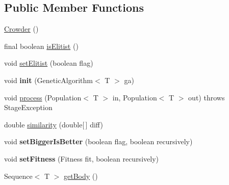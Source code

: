 \subsection*{Public Member Functions}
\begin{DoxyCompactItemize}
\item 
\hyperlink{classjenes_1_1stage_1_1operator_1_1_crowder_3_01_t_01extends_01_chromosome_01_4_a6e23e3544b98e1a415c53fcedd541df5}{Crowder} ()
\item 
final boolean \hyperlink{classjenes_1_1stage_1_1operator_1_1_crowder_3_01_t_01extends_01_chromosome_01_4_ab9bb2a8d6bf09a51158ef49917095913}{is\-Elitist} ()
\item 
void \hyperlink{classjenes_1_1stage_1_1operator_1_1_crowder_3_01_t_01extends_01_chromosome_01_4_ad995907f114cdd40eb03d53f05734b8c}{set\-Elitist} (boolean flag)
\item 
\hypertarget{classjenes_1_1stage_1_1operator_1_1_crowder_3_01_t_01extends_01_chromosome_01_4_a345ecb8e82d64130d171fb785f2702e6}{void {\bfseries init} (Genetic\-Algorithm$<$ T $>$ ga)}\label{classjenes_1_1stage_1_1operator_1_1_crowder_3_01_t_01extends_01_chromosome_01_4_a345ecb8e82d64130d171fb785f2702e6}

\item 
void \hyperlink{classjenes_1_1stage_1_1operator_1_1_crowder_3_01_t_01extends_01_chromosome_01_4_a21f0859b05e06d7ee4b979d5a2d559d7}{process} (Population$<$ T $>$ in, Population$<$ T $>$ out)  throws Stage\-Exception 
\item 
double \hyperlink{classjenes_1_1stage_1_1operator_1_1_crowder_3_01_t_01extends_01_chromosome_01_4_a99b3aaad504589efa9c408fc1b4e2fa1}{similarity} (double\mbox{[}$\,$\mbox{]} diff)
\item 
\hypertarget{classjenes_1_1stage_1_1operator_1_1_crowder_3_01_t_01extends_01_chromosome_01_4_a65ef754570b25a6f14fbd78e6c08c4f9}{void {\bfseries set\-Bigger\-Is\-Better} (boolean flag, boolean recursively)}\label{classjenes_1_1stage_1_1operator_1_1_crowder_3_01_t_01extends_01_chromosome_01_4_a65ef754570b25a6f14fbd78e6c08c4f9}

\item 
\hypertarget{classjenes_1_1stage_1_1operator_1_1_crowder_3_01_t_01extends_01_chromosome_01_4_ac6c89c383d27754be63fabc951e11dc8}{void {\bfseries set\-Fitness} (Fitness fit, boolean recursively)}\label{classjenes_1_1stage_1_1operator_1_1_crowder_3_01_t_01extends_01_chromosome_01_4_ac6c89c383d27754be63fabc951e11dc8}

\item 
Sequence$<$ T $>$ \hyperlink{classjenes_1_1stage_1_1operator_1_1_crowder_3_01_t_01extends_01_chromosome_01_4_a4b24910de47aff7c5a709846af74b199}{get\-Body} ()
\end{DoxyCompactItemize}
